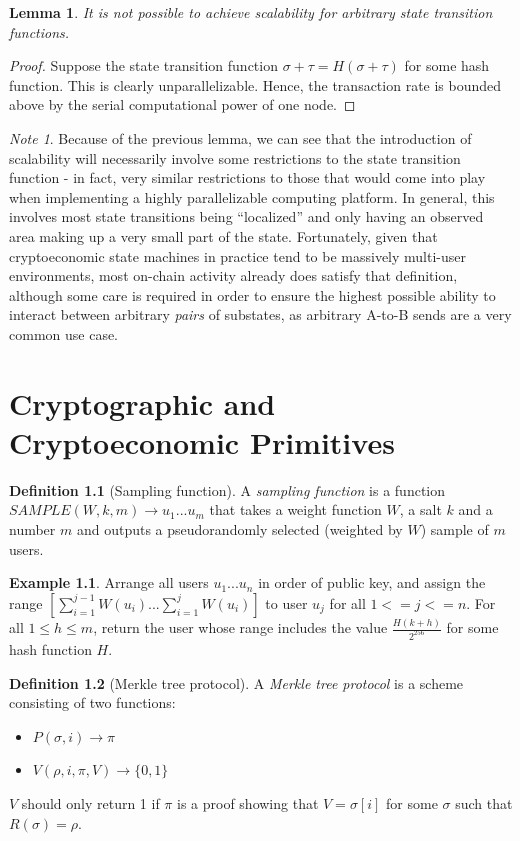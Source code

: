 \documentclass[11pt,a4paper]{report}
\theoremstyle{plain}
\newtheorem{lem}[thm]{Lemma}
\theoremstyle{definition}
\newtheorem{defn}{Definition}[chapter]
\newtheorem{exmp}{Example}[section]
\theoremstyle{remark}
\newtheorem*{note}{Note}
\begin{document}
\begin{lem}
It is not possible to achieve scalability for arbitrary state transition functions.
\end{lem}
\begin{proof}
Suppose the state transition function $\sigma + \tau = H(\sigma + \tau)$ for some hash function. This is clearly unparallelizable. Hence, the transaction rate is bounded above by the serial computational power of one node.
\end{proof}

\begin{note}
Because of the previous lemma, we can see that the introduction of scalability will necessarily involve some restrictions to the state transition function - in fact, very similar restrictions to those that would come into play when implementing a highly parallelizable computing platform. In general, this involves most state transitions being ``localized'' and only having an observed area making up a very small part of the state. Fortunately, given that cryptoeconomic state machines in practice tend to be massively multi-user environments, most on-chain activity already does satisfy that definition, although some care is required in order to ensure the highest possible ability to interact between arbitrary \emph{pairs} of substates, as arbitrary A-to-B sends are a very common use case.
\end{note}


\chapter{Cryptographic and Cryptoeconomic Primitives}

\begin{defn}[Sampling function]
A \emph{sampling function} is a function $SAMPLE(W, k, m) \rightarrow {u_1 ... u_m}$ that takes a weight function $W$, a salt $k$ and a number $m$ and outputs a pseudorandomly selected (weighted by $W$) sample of $m$ users.
\end{defn}

\begin{exmp}
Arrange all users $u_1 ... u_n$ in order of public key, and assign the range $[\sum_{i=1}^{j-1} W(u_i)...\sum_{i=1}^j W(u_i)]$ to user $u_j$ for all $1 <= j <= n$. For all $1 \le h \le m$, return the user whose range includes the value $\frac{H(k + h)}{2^{256}}$ for some hash function $H$.
\end{exmp}

\begin{defn}[Merkle tree protocol]
A \emph{Merkle tree protocol} is a scheme consisting of two functions:
\begin{itemize}
\item
$P(\sigma, i) \rightarrow \pi$
\item
$V(\rho, i, \pi, V) \rightarrow \{0, 1\}$
\end{itemize}
$V$ should only return 1 if $\pi$ is a proof showing that $V = \sigma[i]$ for some $\sigma$ such that $R(\sigma) = \rho$.
\end{defn}
\end{document}
